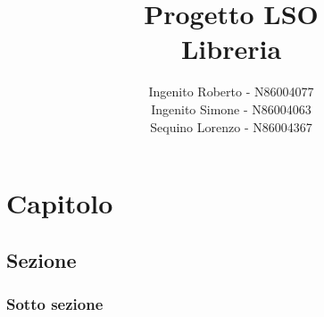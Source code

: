 \documentclass[]{report}
\title{\textbf{Progetto LSO}\\Libreria}
\author{
    Ingenito Roberto - N86004077\\
    Ingenito Simone - N86004063\\
    Sequino Lorenzo - N86004367 
    }
\date{}
\begin{document}
\maketitle

\newpage



\newpage

\chapter{Capitolo}
\section{Sezione}
\subsection{Sotto sezione}
\end{document}
